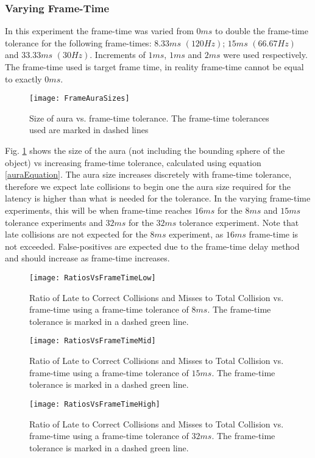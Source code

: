 \subsubsection{Varying Frame-Time}

In this experiment the frame-time was varied from $0ms$ to double the frame-time tolerance for the following frame-times: $8.33ms$ $(120Hz)$; $15ms$ $(66.67Hz)$ and $33.33ms$ $(30Hz)$. Increments of $1ms$, $1ms$ and $2ms$ were used respectively. The frame-time used is target frame time, in reality frame-time cannot be equal to exactly $0ms$.

\begin{figure}
	\centering
	\texttt{[image: FrameAuraSizes]}
	\caption{Size of aura vs. frame-time tolerance. The frame-time tolerances used are marked in dashed lines}
	\label{fig_FrameTimeAuraSize}
\end{figure}

Fig. \ref{fig_FrameTimeAuraSize} shows the size of the aura (not including the bounding sphere of the object) vs increasing frame-time tolerance, calculated using equation \ref{auraEquation}. The aura size increases discretely with frame-time tolerance, therefore we expect late collisions to begin one the aura size required for the latency is higher than what is needed for the tolerance. In the varying frame-time experiments, this will be when frame-time reaches $16ms$ for the $8ms$ and $15ms$ tolerance experiments and $32ms$ for the $32ms$ tolerance experiment. Note that late collisions are not expected for the $8ms$ experiment, as $16ms$ frame-time is not exceeded. False-positives are expected due to the frame-time delay method and should increase as frame-time increases.

\begin{figure}
	\centering
	\texttt{[image: RatiosVsFrameTimeLow]}
	\caption{Ratio of Late to Correct Collisions and Misses to Total Collision vs. frame-time using a frame-time tolerance of $8ms$. The frame-time tolerance is marked in a dashed green line.}
	\label{fig_RatioVsFrameTimeLow}
\end{figure}
\begin{figure}
	\centering
	\texttt{[image: RatiosVsFrameTimeMid]}
	\caption{Ratio of Late to Correct Collisions and Misses to Total Collision vs. frame-time using a frame-time tolerance of $15ms$. The frame-time tolerance is marked in a dashed green line.}
	\label{fig_RatioVsFrameTimeMid}
\end{figure}
\begin{figure}
	\centering
	\texttt{[image: RatiosVsFrameTimeHigh]}
	\caption{Ratio of Late to Correct Collisions and Misses to Total Collision vs. frame-time using a frame-time tolerance of $32ms$. The frame-time tolerance is marked in a dashed green line.}
	\label{fig_RatioVsFrameTimeHigh}
\end{figure}

